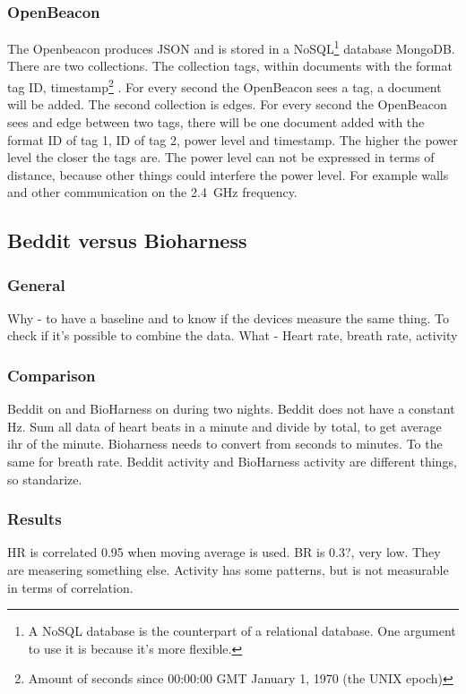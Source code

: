 		\subsubsection{OpenBeacon}
			The Openbeacon produces JSON and is stored in a NoSQL\footnote{A NoSQL database is the counterpart of a relational database. One argument to use it is because it's more flexible.} database MongoDB.
			There are two collections. The collection tags, within documents with the format tag ID, timestamp\footnote{Amount of seconds since 00:00:00 GMT January 1, 1970 (the UNIX epoch)} . For every second the OpenBeacon sees a tag, a document will be added.
			The second collection is edges. For every second the OpenBeacon sees and edge between two tags, there will be one document added with the format ID of tag 1, ID of tag 2, power level and timestamp.
			The higher the power level the closer the tags are. The power level can not be expressed in terms of distance, because other things could interfere the power level. For example walls and other communication on the \SI{2.4}{\giga\hertz} frequency.
	\subsection{Beddit versus Bioharness}
		\subsubsection{General}
			Why - to have a baseline and to know if the devices measure the same thing. To check if it's possible to combine the data.
			What - Heart rate, breath rate, activity
		\subsubsection{Comparison}
			Beddit on and BioHarness on during two nights.
			Beddit does not have a constant Hz. Sum all data of heart beats in a minute and divide by total, to get average ihr of the minute. 
			Bioharness needs to convert from seconds to minutes. To the same for breath rate. 
			Beddit activity and BioHarness activity are different things, so standarize.

		\subsubsection{Results}
			HR is correlated 0.95 when moving average is used.
			BR is 0.3?, very low. They are measering something else.
			Activity has some patterns, but is not measurable in terms of correlation.



